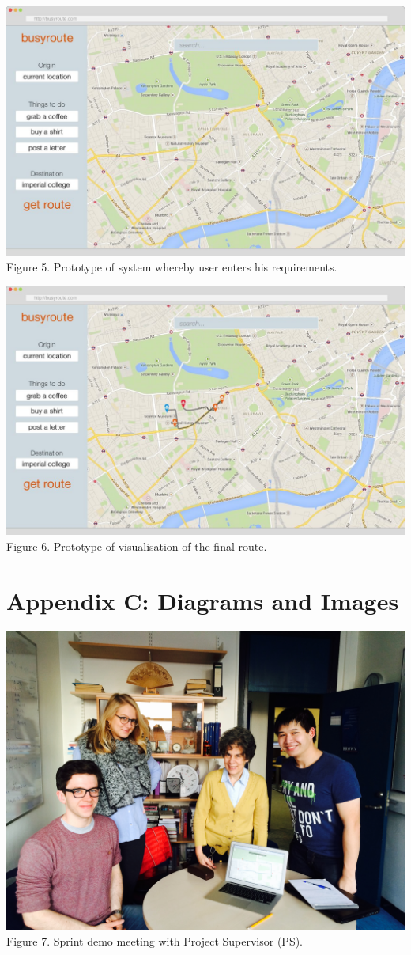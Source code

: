 \documentclass[a4paper, 10pt]{article}
\begin{document}
\begin{center}
\includegraphics[scale=0.4]{proto_3.png}\\
Figure 5. Prototype of system whereby user enters his requirements.
\end{center}

\begin{center}
\includegraphics[scale=0.4]{proto_4.png}\\
Figure 6. Prototype of visualisation of the final route.
\end{center}

\newpage
\section*{Appendix C: Diagrams and Images}
\begin{center}
\includegraphics[scale=0.15]{sophia_x.jpg}\\
Figure 7. Sprint demo meeting with Project Supervisor (PS).
\end{center}
\end{document}
